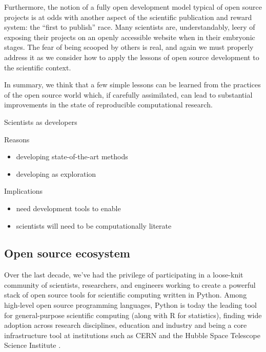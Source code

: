 \documentclass[ChapterTOCs,krantz2]{krantz} %
\theoremstyle{definition}
\begin{document}
Furthermore, the notion of a fully open development model typical of open
source projects is at odds with another aspect of the scientific publication
and reward system: the ``first to publish'' race. Many scientists are,
understandably, leery of exposing their projects on an openly accessible
website when in their embryonic stages. The fear of being scooped by others is
real, and again we must properly address it as we consider how to apply the
lessons of open source development to the scientific context.

In summary, we think that a few simple lessons can be learned from the
practices of the open source world which, if carefully assimilated, can lead to
substantial improvements in the state of reproducible computational research. 

Scientists as developers

Reasons

\begin{itemize}
\item  developing state-of-the-art methods
\item developing as exploration
\end{itemize}

Implications

\begin{itemize}
\item need development tools to enable
\item scientists will need to be computationally literate
\end{itemize}


\subsection{Open source ecosystem}

Over the last decade, we've had the privilege of participating in a loose-knit
community of scientists, researchers, and engineers working to create a powerful
stack of open source tools for scientific computing written in Python.  Among
high-level open source programming languages, Python is today the leading tool
for general-purpose scientific computing (along with R for statistics),
finding wide adoption across research disciplines, education and industry and
being a core infrastructure tool at institutions such as CERN and the Hubble
Space Telescope Science Institute
\cite{millman2011python,Perez2011,ganga09,SST}.
\end{document}
